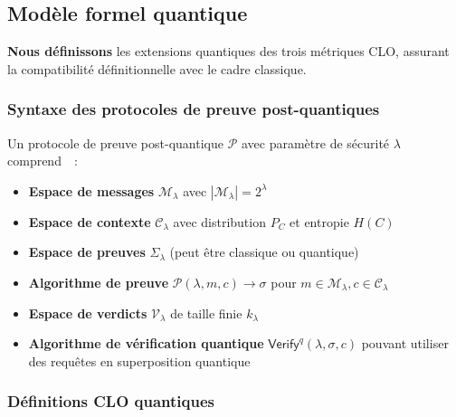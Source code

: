 \subsection{Mod\`ele formel quantique}
\label{subsec:modele_formel_pq}
\begin{sloppypar}
\textbf{Nous d\'efinissons} les extensions quantiques des trois m\'etriques
CLO, assurant la compatibilit\'e d\'efinitionnelle avec le cadre classique.

\subsubsection{Syntaxe des protocoles de preuve post-quantiques}
\label{subsubsec:syntaxe_pq}

\begin{definition}\label{def:protocole_pq}
Un protocole de preuve post-quantique $\mathcal{P}$ avec param\`etre de
s\'ecurit\'e $\lambda$ comprend~\cite{Unruh2016,Chatterjee2021}~:
\begin{itemize}
\item \textbf{Espace de messages} $\mathcal{M}_\lambda$ avec $|\mathcal{M}_\lambda| = 2^\lambda$
\item \textbf{Espace de contexte} $\mathcal{C}_\lambda$ avec distribution $P_C$ et entropie $H(C)$
\item \textbf{Espace de preuves} $\Sigma_\lambda$ (peut \^etre classique ou quantique)
\item \textbf{Algorithme de preuve} $\mathcal{P}(\lambda, m, c) \to \sigma$
pour $m \in \mathcal{M}_\lambda, c \in \mathcal{C}_\lambda$
\item \textbf{Espace de verdicts} $\mathcal{V}_\lambda$ de taille finie $k_\lambda$
\item \textbf{Algorithme de v\'erification quantique} $\mathsf{Verify}^q(\lambda, \sigma, c)$
pouvant utiliser des requ\^etes en superposition quantique~\cite{Watrous2009}
\end{itemize}
\end{definition}

\subsubsection{D\'efinitions CLO quantiques}
\label{subsubsec:definitions_clo_quantiques}


\end{sloppypar}
